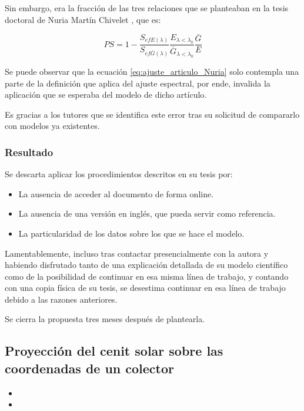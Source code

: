 Sin embargo, era la fracción de las tres relaciones que se planteaban en la tesis doctoral de Nuria Martín Chivelet \cite{Martín_Chivelet_1999}, que es:

\begin{equation}
    PS = 1 - \frac{S_{efE(\lambda)}}{S_{ef\bar{G}(\lambda)}}\frac{E_{\lambda<\lambda_0}}{\bar{G}_{\lambda<\lambda_0}}\frac{\bar{G}}{E}
\end{equation}

Se puede observar que la ecuación \ref{eq:ajuste_articulo_Nuria} solo contempla una parte de la definición que aplica del ajuste espectral, por ende, invalida la aplicación que se esperaba del modelo de dicho artículo.

Es gracias a los tutores que se identifica este error tras su solicitud de compararlo con modelos ya existentes.

\subsubsection{Resultado}

Se descarta aplicar los procedimientos descritos en su tesis \cite{Martín_Chivelet_1999} por:

\begin{itemize}
    \item La ausencia de acceder al documento de forma online.
    \item La ausencia de una versión en inglés, que pueda servir como referencia.
    \item La particularidad de los datos sobre los que se hace el modelo.
\end{itemize}

Lamentablemente, incluso tras contactar presencialmente con la autora y habiendo disfrutado tanto de una explicación detallada de su modelo científico como de la posibilidad de continuar en esa misma línea de trabajo, y contando con una copia física de su tesis, se desestima continuar en esa línea de trabajo debido a las razones anteriores.

Se cierra la propuesta tres meses después de plantearla.

\subsection{Proyección del cenit solar sobre las coordenadas de un colector} \label{sct:desarrollo:contribuciones_cientificas:proyeccion_cenit}

\begin{itemize}
    \item {}
    \item {}
\end{itemize}

